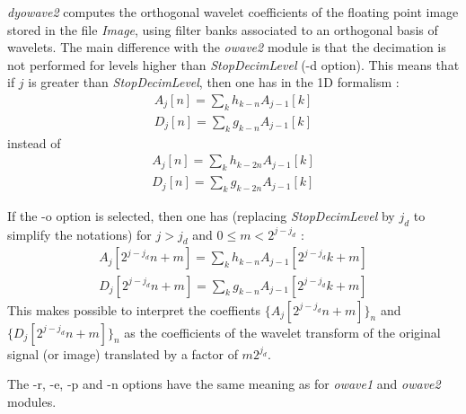 {\em dyowave2} computes the orthogonal wavelet coefficients
of the floating point image stored in the file {\em Image}, 
using filter banks associated to an orthogonal basis of wavelets. 
The main difference with the {\em owave2} module is that the decimation 
is not performed for levels higher than {\em StopDecimLevel} (-d option). 
This means that if $j$ is greater than {\em StopDecimLevel}, then one has 
in the 1D formalism : 
\begin{eqnarray*}
A_{j}[n] = \sum_{k} h_{k-n} A_{j-1}[k] \\
D_{j}[n] = \sum_{k} g_{k-n} A_{j-1}[k] 
\end{eqnarray*}
instead of
\begin{eqnarray*}
A_{j}[n] = \sum_{k} h_{k-2n} A_{j-1}[k] \\
D_{j}[n] = \sum_{k} g_{k-2n} A_{j-1}[k] 
\end{eqnarray*}

If the -o option is selected, then one has (replacing {\em StopDecimLevel} 
by $j_d$ to simplify the notations) for $j > j_d$ and $0\leq m < 2^{j-j_d}$ : 
\begin{eqnarray*}
A_{j}[2^{j-j_d}n+m] = \sum_{k} h_{k-n} A_{j-1}[2^{j-j_d}k+m] \\
D_{j}[2^{j-j_d}n+m] = \sum_{k} g_{k-n} A_{j-1}[2^{j-j_d}k+m] 
\end{eqnarray*}
This makes possible to interpret the coeffients $\{A_{j}[2^{j-j_d}n+m]\}_n$ 
and $\{D_{j}[2^{j-j_d}n+m]\}_n$ as the coefficients of the wavelet transform 
of the original signal (or image) translated by a factor of $m2^{j_d}$.

The -r, -e, -p and -n options have the same meaning as for {\em owave1} and 
{\em owave2} modules. 
